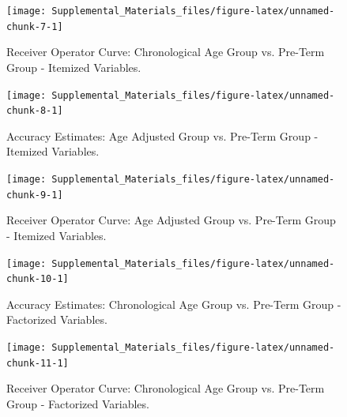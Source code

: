 \documentclass[
]{article}
\begin{document}
\begin{figure}

{\centering \texttt{[image: Supplemental\_Materials\_files/figure-latex/unnamed-chunk-7-1]} 

}

\caption{Receiver Operator Curve: Chronological Age Group vs. Pre-Term Group - Itemized Variables.}\label{fig:unnamed-chunk-7}
\end{figure}

\newpage

\begin{figure}

{\centering \texttt{[image: Supplemental\_Materials\_files/figure-latex/unnamed-chunk-8-1]} 

}

\caption{Accuracy Estimates: Age Adjusted Group vs. Pre-Term Group - Itemized Variables.}\label{fig:unnamed-chunk-8}
\end{figure}
\newpage

\begin{figure}

{\centering \texttt{[image: Supplemental\_Materials\_files/figure-latex/unnamed-chunk-9-1]} 

}

\caption{Receiver Operator Curve: Age Adjusted Group vs. Pre-Term Group - Itemized Variables.}\label{fig:unnamed-chunk-9}
\end{figure}

\newpage

\begin{figure}

{\centering \texttt{[image: Supplemental\_Materials\_files/figure-latex/unnamed-chunk-10-1]} 

}

\caption{Accuracy Estimates: Chronological Age Group vs. Pre-Term Group - Factorized Variables.}\label{fig:unnamed-chunk-10}
\end{figure}

\newpage

\begin{figure}

{\centering \texttt{[image: Supplemental\_Materials\_files/figure-latex/unnamed-chunk-11-1]} 

}

\caption{Receiver Operator Curve: Chronological Age Group vs. Pre-Term Group - Factorized Variables.}\label{fig:unnamed-chunk-11}
\end{figure}
\newpage
\end{document}
